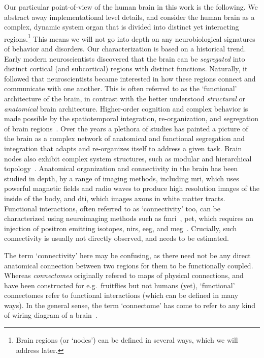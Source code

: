 Our particular point-of-view of the human brain in this work is the following.
We abstract away implementational level details, and consider the human brain as a complex, dynamic system organ that is divided into distinct yet interacting regions.\footnote{Brain regions (or `nodes') can be defined in several ways, which we will address later.}
This means we will not go into depth on any neurobiological signatures of behavior and disorders.
%
Our characterization is based on a historical trend.
Early modern neuroscientists discovered that the brain can be \emph{segregated} into distinct cortical (and subcortical) regions with distinct functions.
Naturally, it followed that neuroscientists became interested in how these regions connect and communicate with one another.
This is often referred to as the `functional' architecture of the brain, in contrast with the better understood \emph{structural} or \emph{anatomical} brain architecture.
Higher-order cognition and complex behavior is made possible by the spatiotemporal integration, re-organization, and segregation of brain regions~\parencite{Deco2011}.
Over the years a plethora of studies has painted a picture of the brain as a complex network of anatomical and functional segregation and integration that adapts and re-organizes itself to address a given task.
Brain nodes also exhibit complex system structures, such as modular and hierarchical topology~\parencite{Meunier2009, Deco2015}.
%
Anatomical organization and connectivity in the brain has been studied in depth, by a range of imaging methods, including \gls{mri}, which uses powerful magnetic fields and radio waves to produce high resolution images of the inside of the body, and \gls{dti}, which images axons in white matter tracts.
Functional interactions, often referred to as `connectivity' too, can be characterized using neuroimaging methods such as \gls{fmri}~\parencite{Soares2016}, \gls{pet}, which requires an injection of positron emitting isotopes, \gls{nirs}, \gls{eeg}, and \gls{meg}~\parencite{Rossini2019}.
Crucially, such connectivity is usually not directly observed, and needs to be estimated.

The term `connectivity' here may be confusing, as there need not be any direct anatomical connection between two regions for them to be functionally coupled.
Whereas \emph{connectomes} originally refered to maps of physical connections, and have been constructed for e.g.~fruitflies but not humans (yet), `functional' connectomes refer to functional interactions (which can be defined in many ways).
In the general sense, the term `connectome' has come to refer to any kind of wiring diagram of a brain~\parencite{Sporns2005}.

